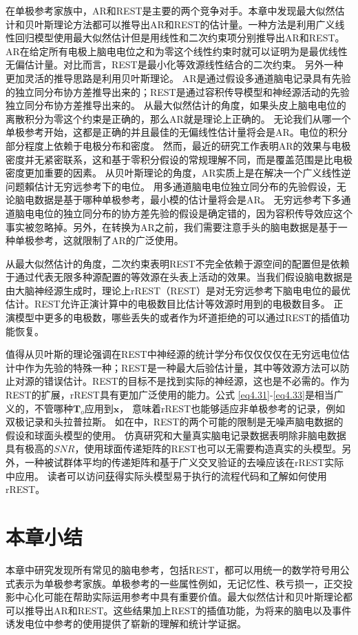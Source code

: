 在单极参考家族中，AR和REST是主要的两个竞争对手。本章中发现最大似然估计和贝叶斯理论方法都可以推导出AR和REST的估计量。一种方法是利用广义线性回归模型使用最大似然估计但是用线性和二次约束项分别推导出AR和REST。 AR在给定所有电极上脑电电位之和为零这个线性约束时就可以证明为是最优线性无偏估计量。对比而言，REST是最小化等效源线性结合的二次约束。
另外一种更加灵活的推导思路是利用贝叶斯理论。 AR是通过假设多通道脑电记录具有先验的独立同分布协方差推导出来的；REST是通过容积传导模型和神经源活动的先验独立同分布协方差推导出来的。 从最大似然估计的角度，如果头皮上脑电电位的离散积分为零这个约束是正确的，那么AR就是理论上正确的。 无论我们从哪一个单极参考开始，这都是正确的并且最佳的无偏线性估计量将会是AR。电位的积分部分程度上依赖于电极分布和密度。 然而，最近的研究工作表明AR的效果与电极密度并无紧密联系，这和基于零积分假设的常规理解不同，而是覆盖范围是比电极密度更加重要的因素。 从贝叶斯理论的角度，AR实质上是在解决一个广义线性逆问题賴估计无穷远参考下的电位。 用多通道脑电电位独立同分布的先验假设，无论脑电数据是基于哪种单极参考，最小模的估计量将会是AR。 无穷远参考下多通道脑电电位的独立同分布的协方差先验的假设是确定错的，因为容积传导效应这个事实被忽略掉。另外，在转换为AR之前，我们需要注意手头的脑电数据是基于一种单极参考，这就限制了AR的广泛使用。

从最大似然估计的角度，二次约束表明REST不完全依赖于源空间的配置但是依赖于通过代表无限多种源配置的等效源在头表上活动的效果。当我们假设脑电数据是由大脑神经源生成时，理论上rREST（REST）是对无穷远参考下脑电电位的最优估计。REST允许正演计算中的电极数目比估计等效源时用到的电极数目多。 正演模型中更多的电极数，哪些丢失的或者作为坏道拒绝的可以通过REST的插值功能恢复。

值得从贝叶斯的理论强调在REST中神经源的统计学分布仅仅仅仅在无穷远电位估计中作为先验的特殊一种；REST是一种最大后验估计量，其中等效源方法可以防止对源的错误估计。REST的目标不是找到实际的神经源，这也是不必需的。作为REST的扩展，rREST具有更加广泛使用的能力。公式 \eqref{eq4.31}-\eqref{eq4.33}是相当广义的，不管哪种$\mathbf{T}_o$应用到$\mathbf{x}$， 意味着rREST也能够适应非单极参考的记录，例如双极记录和头拉普拉斯。 如在\cite{hu_unified_2018}中，REST的两个可能的限制是无噪声脑电数据的假设和球面头模型的使用。 仿真研究和大量真实脑电记录数据表明除非脑电数据具有极高的$SNR$，使用球面传递矩阵的REST也可以无需要构造真实的头模型。另外，一种被试群体平均的传递矩阵和基于广义交叉验证的去噪应该在rREST实际中应用。 读者可以访问\href{https://github.com/ShiangHu/LeadField-Pipeline}获得实际头模型易于执行的流程代码和\href{https://github.com/ShiangHu/Unified-EEG-reference-rREST}了解如何使用rREST。
\section{本章小结}
本章中研究发现所有常见的脑电参考，包括REST，都可以用统一的数学符号用公式表示为单极参考家族。单极参考的一些属性例如，无记忆性、秩亏损一，正交投影中心化可能在帮助实际运用参考中具有重要价值。最大似然估计和贝叶斯理论都可以推导出AR和REST。这些结果加上REST的插值功能，为将来的脑电以及事件诱发电位中参考的使用提供了崭新的理解和统计学证据。